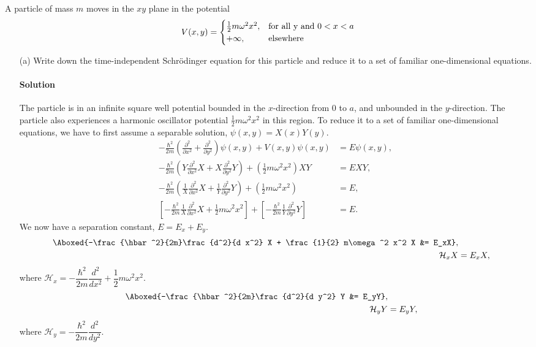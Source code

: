 \documentclass{article}
\numberwithin{equation}{section}
\begin{document}
	A particle of mass $m$ moves in the $xy$ plane in the potential
	\begin{equation}
		V(x,y) = \begin{cases}
			\frac{1}{2} m\omega^2 x^2,  &  \text{for all } $y$ \text{ and } 0 < x < a \\
			+\infty,  &  \text{elsewhere}
		\end{cases}
	\end{equation}
	\begin{enumerate}
		\item[(a)] Write down the time-independent Schrödinger equation for this particle and reduce it to a set of familiar one-dimensional equations.
		\paragraph{Solution} The particle is in an infinite square well potential bounded in the $x$-direction from $0$ to $a$, and unbounded in the $y$-direction. The particle also experiences a harmonic oscillator potential $\frac{1}{2} m\omega^2 x^2$ in this region. To reduce it to a set of familiar one-dimensional equations, we have to first assume a separable solution, $\psi(x,y) = X(x)Y(y)$.
		\begin{align}
			-\frac{\hbar^2}{2m} \left( \frac{\partial^2 }{\partial x^2} + \frac{\partial^2 }{\partial y^2} \right) \psi(x,y) + V(x,y)\psi(x,y) &= E\psi(x,y), \\
			-\frac{\hbar^2}{2m} \left( Y\frac{\partial^2 }{\partial x^2} X + X\frac{\partial^2 }{\partial y^2} Y \right) + \left( \frac{1}{2} m\omega^2 x^2 \right)XY &= EXY, \\
			-\frac{\hbar^2}{2m} \left( \frac{1}{X}\frac{\partial^2 }{\partial x^2} X + \frac{1}{Y}\frac{\partial^2 }{\partial y^2} Y \right) + \left( \frac{1}{2} m\omega^2 x^2 \right) &= E, \\
			\left[ -\frac{\hbar^2}{2m}\frac{1}{X}\frac{\partial^2 }{\partial x^2} X + \frac{1}{2} m\omega^2 x^2 \right] + \left[ -\frac{\hbar^2}{2m}\frac{1}{Y}\frac{\partial^2 }{\partial y^2} Y \right] &= E.
		\end{align}
		We now have a separation constant, $E = E_x + E_y$.
		\begin{align}
			\Aboxed{-\frac{\hbar^2}{2m}\frac{d^2}{d x^2} X + \frac{1}{2} m\omega^2 x^2 X &= E_xX}, \\
			\mathcal{H}_x X &= E_xX,
		\end{align}
		where $\mathcal{H}_x = -\dfrac{\hbar^2}{2m}\dfrac{d^2}{d x^2} + \dfrac{1}{2} m\omega^2 x^2$.
		\begin{align}
			\Aboxed{-\frac{\hbar^2}{2m}\frac{d^2}{d y^2} Y &= E_yY}, \\
			\mathcal{H}_y Y &= E_yY,
		\end{align}
		where $\mathcal{H}_y = -\dfrac{\hbar^2}{2m}\dfrac{d^2}{d y^2}$.
				

\end{enumerate}
\end{document}
